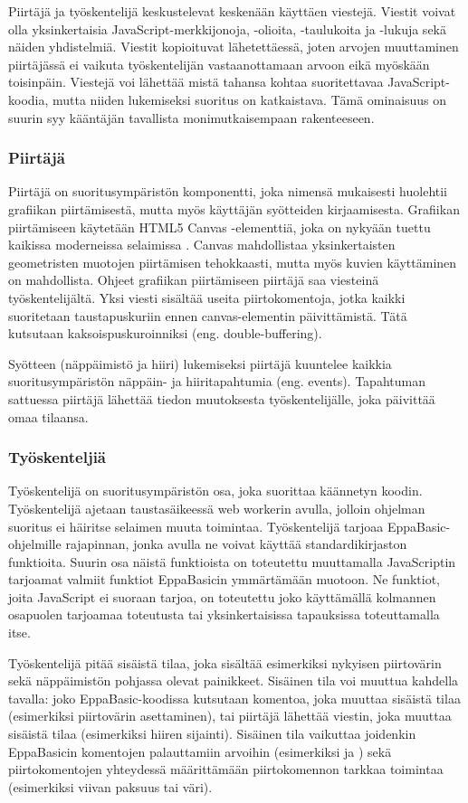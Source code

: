 Piirtäjä ja työskentelijä keskustelevat
keskenään käyttäen viestejä.
Viestit voivat olla yksinkertaisia
JavaScript-merkkijonoja,
-olioita, -taulukoita ja -lukuja
sekä näiden yhdistelmiä.
Viestit kopioituvat lähetettäessä,
joten arvojen muuttaminen piirtäjässä
ei vaikuta työskentelijän vastaanottamaan
arvoon eikä myöskään toisinpäin.
Viestejä voi lähettää mistä tahansa kohtaa
suoritettavaa JavaScript-koodia,
mutta niiden lukemiseksi suoritus on katkaistava.
Tämä ominaisuus on suurin syy kääntäjän
tavallista monimutkaisempaan rakenteeseen.

\subsubsection{Piirtäjä}
Piirtäjä on suoritusympäristön komponentti,
joka nimensä mukaisesti huolehtii
grafiikan piirtämisestä,
mutta myös käyttäjän syötteiden kirjaamisesta.
Grafiikan piirtämiseen käytetään
HTML5 Canvas -elementtiä,
joka on nykyään tuettu kaikissa moderneissa
selaimissa \cite{caniuse_canvas}.
Canvas mahdollistaa yksinkertaisten
geometristen muotojen piirtämisen tehokkaasti,
mutta myös kuvien käyttäminen on mahdollista.
Ohjeet grafiikan piirtämiseen piirtäjä
saa viesteinä työskentelijältä.
Yksi viesti sisältää useita piirtokomentoja,
jotka kaikki suoritetaan taustapuskuriin ennen
canvas-elementin päivittämistä.
Tätä kutsutaan kaksoispuskuroinniksi
(eng. double-buffering).

Syötteen (näppäimistö ja hiiri) lukemiseksi
piirtäjä kuuntelee kaikkia suoritusympäristön
näp\-päin- ja hiiritapahtumia (eng. events).
Tapahtuman sattuessa piirtäjä
lähettää tiedon muutoksesta työskentelijälle,
joka päivittää omaa tilaansa.

\subsubsection{Työskenteljiä}
Työskentelijä on suoritusympäristön osa,
joka suorittaa käännetyn koodin.
Työskentelijä ajetaan taustasäikeessä
web workerin avulla, jolloin ohjelman
suoritus ei häiritse selaimen muuta toimintaa.
Työskentelijä tarjoaa EppaBasic-ohjelmille
rajapinnan, jonka avulla ne voivat käyttää
standardikirjaston funktioita.
Suurin osa näistä funktioista on toteutettu
muuttamalla JavaScriptin tarjoamat valmiit
funktiot EppaBasicin ymmärtämään muotoon.
Ne funktiot, joita JavaScript ei suoraan tarjoa,
on toteutettu joko käyttämällä kolmannen osapuolen
tarjoamaa toteutusta tai yksinkertaisissa
tapauksissa toteuttamalla itse.

Työskentelijä pitää sisäistä tilaa,
joka sisältää esimerkiksi nykyisen piirtovärin
sekä näppäimistön pohjassa olevat painikkeet.
Sisäinen tila voi muuttua kahdella tavalla:
joko EppaBasic-koodissa kutsutaan komentoa,
joka muuttaa sisäistä tilaa
(esimerkiksi piirtovärin asettaminen),
tai piirtäjä lähettää viestin,
joka muuttaa sisäistä tilaa
(esimerkiksi hiiren sijainti).
Sisäinen tila vaikuttaa joidenkin
EppaBasicin komentojen palauttamiin arvoihin
(esimerkiksi  ja )
sekä piirtokomentojen yhteydessä määrittämään
piirtokomennon tarkkaa toimintaa
(esimerkiksi viivan paksuus tai väri).
